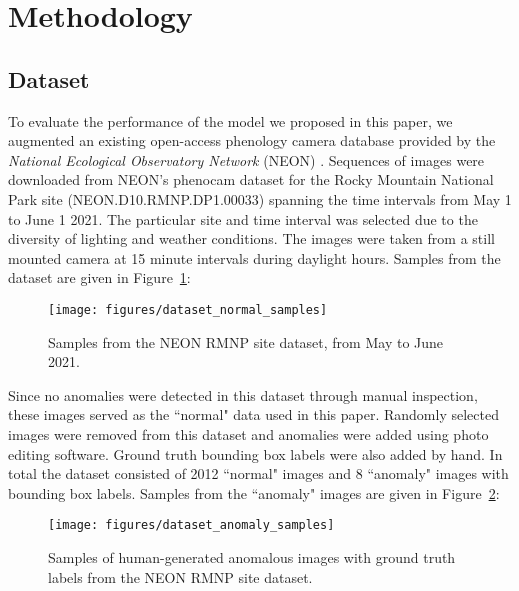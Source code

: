 \documentclass[12pt]{article}
\begin{document}
\section{Methodology}
\subsection{Dataset}

To evaluate the performance of the model we proposed in this paper, we augmented an existing open-access phenology camera database provided by the \textit{National Ecological Observatory Network} (NEON) \cite{neon_dataset}. Sequences of images were downloaded from NEON's phenocam dataset for the Rocky Mountain National Park site (NEON.D10.RMNP.DP1.00033) spanning the time intervals from May 1 to June 1 2021. The particular site and time interval was selected due to the diversity of lighting and weather conditions. The images were taken from a still mounted camera at 15 minute intervals during daylight hours. Samples from the dataset are given in Figure~\ref{fig:neon_samples}:

\begin{figure}[H]
\begin{center}
\texttt{[image: figures/dataset\_normal\_samples]} \\
\end{center}
\caption{Samples from the NEON RMNP site dataset, from May to June 2021.}
\label{fig:neon_samples}
\end{figure}

Since no anomalies were detected in this dataset through manual inspection, these images served as the ``normal" data used in this paper. Randomly selected images were removed from this dataset and anomalies were added using photo editing software. Ground truth bounding box labels were also added by hand. In total the dataset consisted of 2012 ``normal" images and 8 ``anomaly" images with bounding box labels. Samples from the ``anomaly" images are given in Figure~\ref{fig:neon_anomaly_samples}:

\begin{figure}[H]
\begin{center}
\texttt{[image: figures/dataset\_anomaly\_samples]}
\end{center}
\caption{Samples of human-generated anomalous images with ground truth labels from the NEON RMNP site dataset.}
\label{fig:neon_anomaly_samples}
\end{figure}
\end{document}
